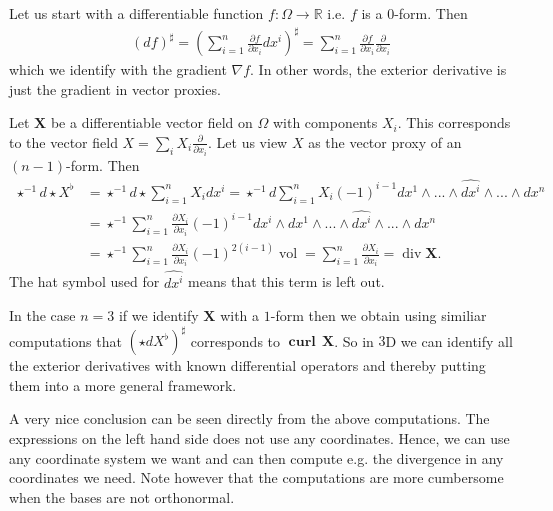 \documentclass[12pt,a4paper]{article}
\numberwithin{equation}{subsection}
\numberwithin{lemma}{subsection}
\theoremstyle{definition}
\DeclareMathOperator{\curl}{curl}
\DeclareMathOperator{\diver}{div}
\DeclareMathOperator{\vol}{vol}
\newcommand{\real}{\mathbb{R}}
\begin{document}
Let us start with a differentiable function $f: \Omega \rightarrow \real$ i.e. 
$f$ is a $0$-form. Then
\begin{align*}
    (df)^\sharp = \left( \sum_{i=1}^n \frac{\partial f}{\partial x_i} dx^i 
        \right)^\sharp
    = \sum_{i=1}^n \frac{\partial f}{\partial x_i} \frac{\partial}{\partial x_i}
\end{align*}
which we identify with the gradient $\nabla f$. In other words, 
the exterior derivative is just the gradient in vector proxies.

Let $\mathbf{X}$ be a differentiable vector field on $\Omega$ 
with components $X_i$. This corresponds to the vector field 
$X = \sum_i X_i \frac{\partial}{\partial x_i}$. Let us view
$X$ as the vector proxy 
of an $(n-1)$-form. Then 
\begin{align*}
    \star^{-1} d\star X^\flat &= \star^{-1} d\star \sum_{i=1}^n X_i dx^i
    = \star^{-1} d \sum_{i=1}^n X_i (-1)^{i-1} 
        dx^1 \wedge ... \wedge \widehat{dx^i} 
        \wedge ... 
        \wedge dx^n
    \\ &= \star^{-1} \sum_{i=1}^n \frac{\partial X_i}{\partial x_i} (-1)^{i-1} 
        dx^i \wedge 
        dx^1 \wedge ... \wedge \widehat{dx^i} \wedge ... \wedge dx^n
    \\ &= \star^{-1} \sum_{i=1}^n \frac{\partial X_i}{\partial x_i} 
        (-1)^{2(i-1)} \vol
    = \sum_{i=1}^n \frac{\partial X_i}{\partial x_i}
    = \diver \mathbf{X}.
\end{align*}
The hat symbol used for
$\widehat{dx^i}$ means that this term is left out. 

In the case $n=3$ if we identify $\mathbf{X}$ with a $1$-form then 
we obtain using similiar computations
that $(\star d X^\flat)^\sharp$ corresponds to  $\mathbf{\curl} \,\mathbf{X}$.
So in $3$D we can identify all the exterior derivatives with known differential
operators and thereby putting them into a more general framework.

A very nice conclusion can be seen directly from the above computations. The 
expressions on the left hand side does not use any coordinates. Hence, 
we can use any coordinate system we want and can then compute e.g. the 
divergence in any coordinates we need. Note however that the computations are
more cumbersome when the bases are not orthonormal.
\end{document}
